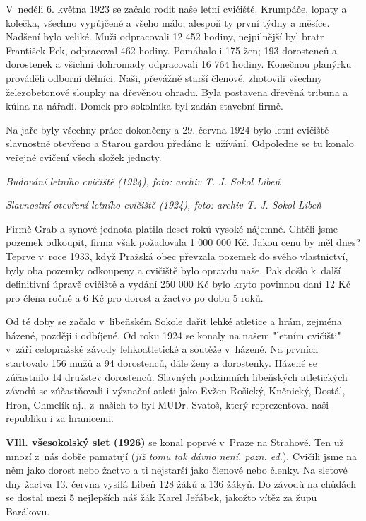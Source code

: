 \documentclass[a5paper, 12pt, twoside]{article}
\begin{document}
V~neděli 6. května 1923 se začalo rodit naše letní cvičiště. Krumpáče,
lopaty a kolečka, všechno vypůjčené a všeho málo; alespoň ty první týdny
a měsíce. Nadšení bylo veliké. Muži odpracovali 12 452 hodiny,
nejpilnější byl bratr František Pek, odpracoval 462 hodiny. Pomáhalo i
175 žen; 193 dorostenců a dorostenek a všichni dohromady odpracovali 16
764 hodiny. Konečnou planýrku prováděli odborní dělníci. Naši, převážně
starší členové, zhotovili všechny železobetonové sloupky na dřevěnou
ohradu. Byla postavena dřevěná tribuna a kůlna na nářadí. Domek pro
sokolníka byl zadán stavební firmě.

Na jaře byly všechny práce dokončeny a 29. června 1924 bylo letní
cvičiště slavnostně otevřeno a Starou gardou předáno k~užívání.
Odpoledne se tu konalo veřejné cvičení všech složek jednoty.


\textit{Budování letního cvičiště (1924), foto: archiv T. J. Sokol Libeň}


\textit{Slavnostní otevření letního cvičiště (1924), foto: archiv T. J.
Sokol Libeň}

Firmě Grab a synové jednota platila deset roků vysoké nájemné. Chtěli
jsme pozemek odkoupit, firma však požadovala 1 000 000 Kč. Jakou cenu by
měl dnes? Teprve v~roce 1933, když Pražská obec převzala pozemek do
svého vlastnictví, byly oba pozemky odkoupeny a cvičiště bylo opravdu
naše. Pak došlo k~další definitivní úpravě cvičiště a vydání 250 000 Kč
bylo kryto povinnou daní 12 Kč pro člena ročně a 6 Kč pro dorost a
žactvo po dobu 5 roků.

Od té doby se začalo v~libeňském Sokole dařit lehké atletice a hrám,
zejména házené, později i odbíjené. Od roku 1924 se konaly na našem
"letním cvičišti" v~září celopražské závody lehkoatletické a soutěže
v~házené. Na prvních startovalo 156 mužů a 94 dorostenců, dále ženy a
dorostenky. Házené se zúčastnilo 14 družstev dorostenců. Slavných
podzimních libeňských atletických závodů se zúčastňovali i význační
atleti jako Evžen Rošický, Kněnický, Dostál, Hron, Chmelík aj., z~našich
to byl MUDr. Svatoš, který reprezentoval naši republiku i za hranicemi.

\textbf{VIll. všesokolský slet (1926)} se konal poprvé v~Praze na
Strahově. Ten už mnozí z~nás dobře pamatují (\textit{již tomu tak dávno
není, pozn. ed.}). Cvičili jsme na něm jako dorost nebo žactvo a ti
nejstarší jako členové nebo členky. Na sletové dny žactva 13. června
vysílá Libeň 128 žáků a 136 žákyň. Do závodů na chůdách se dostal mezi 5
nejlepších náš žák Karel Jeřábek, jakožto vítěz za župu Barákovu.
\end{document}
